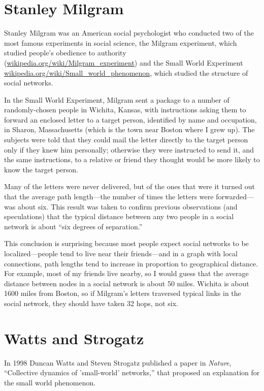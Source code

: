 \documentclass[10pt]{book}
\begin{document}
\section{Stanley Milgram}

Stanley Milgram was an American social psychologist who conducted
two of the most famous experiments in social science, the
Milgram experiment, which studied people's obedience to authority
(\url{wikipedia.org/wiki/Milgram_experiment})
and the Small World Experiment
\url{wikipedia.org/wiki/Small_world_phenomenon}, which studied
the structure of social networks.

In the Small World Experiment, Milgram sent a package to a number of
randomly-chosen people in Wichita, Kansas, with instructions asking
them to forward an enclosed letter to a target person, identified by
name and occupation, in Sharon, Massachusetts (which is the town near
Boston where I grew up).  The subjects were told that they could mail
the letter directly to the target person only if they knew him
personally; otherwise they were instructed to send it, and the same
instructions, to a relative or friend they thought would be more
likely to know the target person.

Many of the letters were never delivered, but of the ones that
were it turned out that the average path length---the number of
times the letters were forwarded---was about six.  This result
was taken to confirm previous observations (and speculations) that
the typical distance between any two people in a social network
is about ``six degrees of separation.''

This conclusion is surprising because most people expect social
networks to be localized---people tend to live near their
friends---and in a graph with local connections, path lengths tend to
increase in proportion to geographical distance.  For example, most of
my friends live nearby, so I would guess that the average distance
between nodes in a social network is about 50 miles.  Wichita is about
1600 miles from Boston, so if Milgram's letters traversed typical
links in the social network, they should have taken 32 hops, not six.


\section{Watts and Strogatz}

In 1998 Duncan Watts and Steven Strogatz published a paper
in {\em Nature}, ``Collective dynamics of 'small-world' networks,''
that proposed an explanation for the small world phenomenon.
\end{document}
